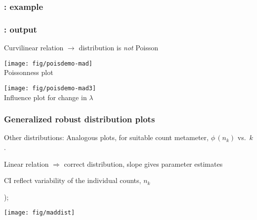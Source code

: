 \begin{frame}[fragile]
  \frametitle{: example}
\end{frame}

\begin{frame}
  \frametitle{: output}
Curvilinear relation $\rightarrow$ distribution is \emph{not} Poisson
 \begin{minipage}[c]{.49\dispwidth}
  \texttt{[image: fig/poisdemo-mad]}
  \\ \centering Poissonness plot
 \end{minipage}%
 \hfill
 \begin{minipage}[c]{.49\dispwidth}
  \texttt{[image: fig/poisdemo-mad3]}
  \\ \centering Influence plot for change in $\lambda$
 \end{minipage}

\end{frame}

\begin{frame}[fragile]
  \frametitle{Generalized robust distribution plots}
  Other distributions: Analogous plots, for suitable count metameter, 
  $\phi \,  ( n_k )$
  vs.\ $k$.
  \begin{itemize*}
  \item Linear relation $\Rightarrow$ correct distribution, slope gives parameter estimates
  \item CI reflect variability of the individual counts, $n_k$
  \item {}
  \end{itemize*}

  \begin{Code}
        );
  \end{Code}

  \begin{center}
	\texttt{[image: fig/maddist]}
  \end{center}
\end{frame}
